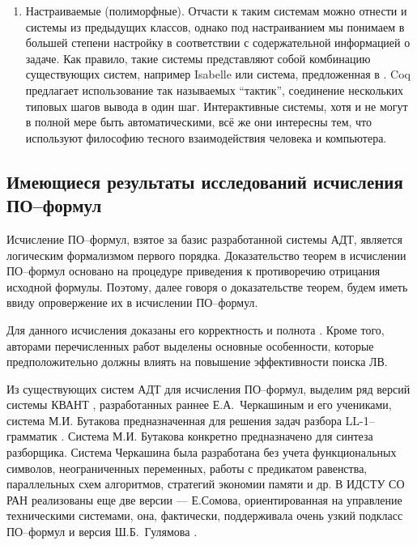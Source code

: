 \begin{enumerate}
\item Настраиваемые (полиморфные). Отчасти к таким системам можно отнести и системы из предыдущих классов, однако под настраиванием мы понимаем в большей степени настройку в соответствии с содержательной информацией о задаче. Как правило, такие системы представляют собой комбинацию существующих систем, например Isabelle \cite{Isabelle} или система, предложенная в \cite{ProblemOrientedATP1}. Coq \cite{LaCoq} предлагает использование так называемых ``тактик'', соединение нескольких типовых шагов вывода в один шаг. Интерактивные системы, хотя и не могут в полной мере быть автоматическими, всё же они интересны тем, что используют философию тесного взаимодействия человека и компьютера.
\end{enumerate}


\subsection{Имеющиеся результаты исследований исчисления ПО--формул}
Исчисление ПО--формул, взятое за базис разработанной системы АДТ, является логическим формализмом первого порядка. Доказательство теорем в исчислении ПО--формул основано на процедуре приведения к противоречию отрицания исходной формулы. Поэтому, далее говоря о доказательстве теорем, будем иметь ввиду опровержение их в исчислении ПО--формул.

Для данного исчисления доказаны его корректность и полнота \cite{ICDS2000, dissZherlov, DavydovX}. Кроме того, авторами перечисленных работ выделены основные особенности, которые предположительно должны влиять на повышение эффективности поиска ЛВ.

Из существующих систем АДТ для исчисления ПО--формул, выделим ряд версий системы КВАНТ \cite{dissChe, Che2, QUANT4}, разработанных раннее Е.А.~Черкашиным и его учениками, система М.И. Бутакова предназначенная для решения задач разбора LL-1--грамматик \cite{Butakov1}. Система М.И. Бутакова конкретно предназначено для синтеза разборщика. Система Черкашина была разработана без учета функциональных символов, неограниченных переменных, работы с предикатом равенства, параллельных схем алгоритмов, стратегий экономии памяти и др. В ИДСТУ СО РАН реализованы еще две версии --- Е.Сомова, ориентированная на управление техническими системами, она, фактически, поддерживала очень узкий подкласс ПО--формул и версия Ш.Б.~Гулямова \cite{Gulamov}.

